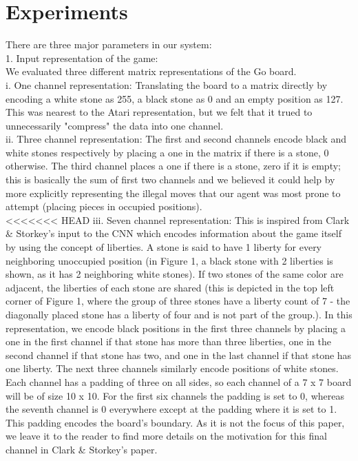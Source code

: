 \section{Experiments}
There are three major parameters in our system:
\\
1. Input representation of the game:
\\
We evaluated three different matrix representations of the Go board.
\\
i. One channel representation: Translating the board to a matrix directly by encoding a white stone as 255, a black stone as 0 and an empty position as 127. This was nearest to the Atari representation, but we felt that it trued to unnecessarily "compress" the data into one channel.
\\ii. Three channel representation: The first and second channels encode black and white stones respectively by placing a one in the matrix if there is a stone, 0 otherwise. The third channel places a one if there is a stone, zero if it is empty; this is basically the sum of first two channels and we believed it could help by more explicitly representing the illegal moves that our agent was most prone to attempt (placing pieces in occupied positions).
\\
<<<<<<< HEAD
iii. Seven channel representation: This is inspired from Clark \& Storkey's input to the CNN which encodes information about the game itself by using the concept of liberties. A stone is said to have 1 liberty for every neighboring unoccupied position (in Figure 1, a black stone with 2 liberties is shown, as it has 2 neighboring white stones). If two stones of the same color are adjacent, the liberties of each stone are shared (this is depicted in the top left corner of Figure 1, where the group of three stones have a liberty count of 7 - the diagonally placed stone has a liberty of four and is not part of the group.). In this representation, we encode black positions in the first three channels by placing a one in the first channel if that stone has more than three liberties, one in the second channel if that stone has two, and one in the last channel if that stone has one liberty. The next three channels similarly encode positions of white stones. Each channel has a padding of three on all sides, so each channel of a 7 x 7 board will be of size 10 x 10. For the first six channels the padding is set to 0, whereas the seventh channel is 0 everywhere except at the padding where it is set to 1. This padding encodes the board's boundary. As it is not the focus of this paper, we leave it to the reader to find more details on the motivation for this final channel in Clark \& Storkey's paper.
